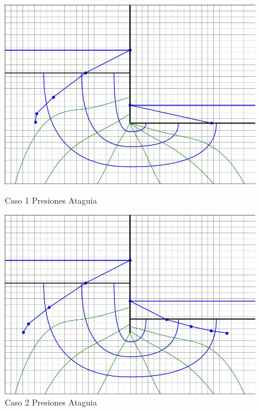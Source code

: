 \documentclass{article}
\begin{document}
\begin{figure}[H]
  \centering
  \begin{minipage}{0.32\textwidth}
      \centering
      \includegraphics[width=\textwidth]{FOTOS/caso_1_presion_ataquia_total.jpg}
      \caption{Caso 1 Presiones Ataguia}
  \end{minipage}
  \begin{minipage}{0.32\textwidth}
      \centering
      \includegraphics[width=\textwidth]{FOTOS/caso_2_presion_ataquia_total.jpg}
      \caption{Caso 2 Presiones Ataguia}
  \end{minipage}
  \begin{minipage}{0.32\textwidth}
      \centering

\end{minipage}
\end{figure}
\end{document}
